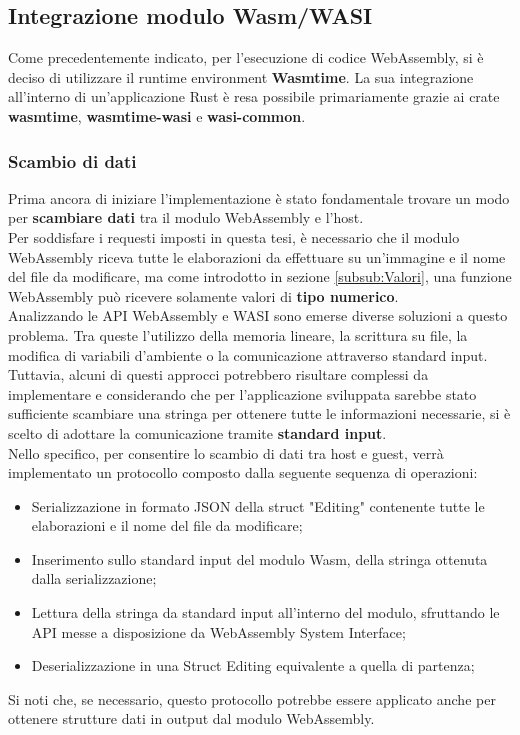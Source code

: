 \subsection{Integrazione modulo Wasm/WASI}
Come precedentemente indicato, per l'esecuzione di codice WebAssembly, si è deciso di utilizzare il runtime environment \textbf{Wasmtime}.
La sua integrazione all'interno di un'applicazione Rust è resa possibile primariamente grazie ai crate \textbf{wasmtime}, \textbf{wasmtime-wasi} e \textbf{wasi-common}.
\subsubsection{Scambio di dati}
Prima ancora di iniziare l'implementazione è stato fondamentale trovare un modo per \textbf{scambiare dati} tra il modulo WebAssembly e l'host.
\\Per soddisfare i requesti imposti in questa tesi, è necessario che il modulo WebAssembly riceva tutte le elaborazioni da effettuare su un'immagine e il nome del file da modificare, ma come introdotto in sezione \ref{subsub:Valori}, una funzione WebAssembly può ricevere solamente valori di \textbf{tipo numerico}.
\\Analizzando le API WebAssembly e WASI sono emerse diverse soluzioni a questo problema. Tra queste l'utilizzo della memoria lineare, la scrittura su file, la modifica di variabili d'ambiente o la comunicazione attraverso standard input.
Tuttavia, alcuni di questi approcci potrebbero risultare complessi da implementare e considerando che per l'applicazione sviluppata sarebbe stato sufficiente scambiare una stringa per ottenere tutte le informazioni necessarie, si è scelto di adottare la comunicazione tramite \textbf{standard input}.
\\Nello specifico, per consentire lo scambio di dati tra host e guest, verrà implementato un protocollo composto dalla seguente sequenza di operazioni:
\begin{itemize}
    \item Serializzazione in formato JSON della struct "Editing" contenente tutte le elaborazioni  e il nome del file da modificare;
    \item Inserimento sullo standard input del modulo Wasm, della stringa ottenuta dalla serializzazione;
    \item Lettura della stringa da standard input all'interno del modulo, sfruttando le API messe a disposizione da WebAssembly System Interface;
    \item Deserializzazione in una Struct Editing equivalente a quella di partenza;
\end{itemize}
Si noti che, se necessario, questo protocollo potrebbe essere applicato anche per ottenere strutture dati in output dal modulo WebAssembly.
